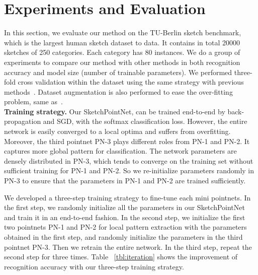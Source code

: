 \section{Experiments and Evaluation}
\label{sec:experiments}

In this section, we evaluate our method on the TU-Berlin sketch benchmark, which is the largest human sketch dataset to data.
%
It contains in total 20000 sketches of 250 categories. Each category has 80 instances.
%
We do a group of experiments to compare our method with other methods in both recognition accuracy and model size (number of trainable parameters).
%
We performed three-fold cross validation within the dataset using
the same strategy with previous methods~\cite{Yu2015SketchaNetTB, Dupont2016DeepSketch2D}.
Dataset augmentation is also performed to ease the over-fitting problem, same as~\cite{Yu2015SketchaNetTB}.
\\


\noindent \textbf{Training strategy.}
%
Our SketchPointNet,  can be trained end-to-end by back-propagation and SGD, with the softmax classification loss.
%
However, the entire network is easily converged to a local optima and suffers from overfitting.
Moreover, the third pointnet PN-3 plays different roles from PN-1 and PN-2. It captures more global pattern for classification.
%
%
The network parameters are densely distributed in PN-3, which tends to converge on the training set without sufficient training for PN-1 and PN-2.
So we re-initialize parameters randomly in PN-3 to ensure that the parameters in PN-1 and PN-2 are trained sufficiently.

We developed a three-step training strategy to fine-tune each mini pointnets.
%
In the first step, we randomly initialize all the parameters in our SketchPointNet and  train it in an end-to-end fashion.
%
In the second step, we initialize the first two pointnets PN-1 and PN-2 for local pattern extraction with the parameters obtained in the first step, and randomly initialize the parameters in the third pointnet PN-3. Then we retrain the entire network.
%
In the third step, repeat the second step for three times.
%
Table ~\ref{tbl:iteration} shows the improvement of recognition accuracy with our three-step training strategy.

